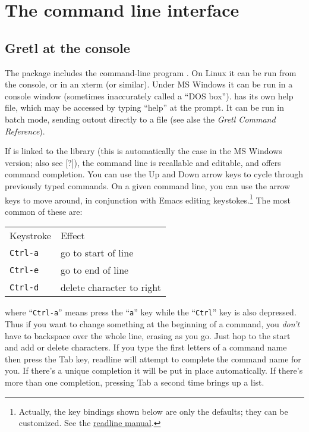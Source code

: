 \chapter{The command line interface}
\label{cli}



\section{Gretl at the console}
\label{cli-console}


      The  package includes the
      command-line program . On
      Linux it can be run from the console, or in an xterm (or
      similar).  Under MS Windows it can be run in a console window
      (sometimes inaccurately called a ``DOS box'').
       has its own help file, which
      may be accessed by typing ``help'' at the prompt. It
      can be run in batch mode, sending outout directly to a file (see
      alse the \emph{Gretl Command Reference}).
    
      If  is linked to the
       library (this is
      automatically the case in the MS Windows version; also see
      [?]), the command line is recallable
      and editable, and offers command completion.  You can use the Up
      and Down arrow keys to cycle through previously typed commands.
      On a given command line, you can use the arrow keys to move
      around, in conjunction with Emacs editing
      keystokes.\footnote{Actually, the key bindings shown below
	  are only the defaults; they can be customized.  See the
	  \href{http://cnswww.cns.cwru.edu/~chet/readline/readline.html}{readline 
	    manual}.} The most common of these are:
    

\begin{center}
\begin{tabular}{ll}
Keystroke & Effect\\
\verb+Ctrl-a+ & go to start of line\\
\verb+Ctrl-e+ & go to end of line\\
\verb+Ctrl-d+ & delete character to right\\
\end{tabular}
\end{center}


      where ``\verb+Ctrl-a+'' means press the
      ``\verb+a+'' key while the
      ``\verb+Ctrl+'' key is also depressed.
      Thus if you want to change something at the beginning of a
      command, you \emph{don't} have to backspace over
      the whole line, erasing as you go.  Just hop to the start and
      add or delete characters.
    If you type the first letters of a command name then press
      the Tab key, readline will attempt to complete the command name
      for you.  If there's a unique completion it will be put in place
      automatically.  If there's more than one completion, pressing
      Tab a second time brings up a list.

